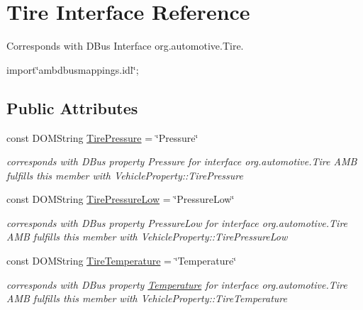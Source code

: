 \hypertarget{interfaceTire}{\section{Tire Interface Reference}
\label{interfaceTire}
}


Corresponds with D\+Bus Interface org.\+automotive.\+Tire.  




{\ttfamily import\char`\"{}ambdbusmappings.\+idl\char`\"{};}

\subsection*{Public Attributes}
\begin{DoxyCompactItemize}
\item 
\hypertarget{interfaceTire_ae9f48caaabe548696d27bc956b135e29}{const D\+O\+M\+String \hyperlink{interfaceTire_ae9f48caaabe548696d27bc956b135e29}{Tire\+Pressure} = \char`\"{}Pressure\char`\"{}}\label{interfaceTire_ae9f48caaabe548696d27bc956b135e29}

\begin{DoxyCompactList}\small\item\em corresponds with D\+Bus property Pressure for interface org.\+automotive.\+Tire A\+M\+B fulfills this member with Vehicle\+Property\+::\+Tire\+Pressure \end{DoxyCompactList}\item 
\hypertarget{interfaceTire_ac3e05d38925b7377fc2a15544cabed91}{const D\+O\+M\+String \hyperlink{interfaceTire_ac3e05d38925b7377fc2a15544cabed91}{Tire\+Pressure\+Low} = \char`\"{}Pressure\+Low\char`\"{}}\label{interfaceTire_ac3e05d38925b7377fc2a15544cabed91}

\begin{DoxyCompactList}\small\item\em corresponds with D\+Bus property Pressure\+Low for interface org.\+automotive.\+Tire A\+M\+B fulfills this member with Vehicle\+Property\+::\+Tire\+Pressure\+Low \end{DoxyCompactList}\item 
\hypertarget{interfaceTire_ab20d18865a45ca32561df4783b15e787}{const D\+O\+M\+String \hyperlink{interfaceTire_ab20d18865a45ca32561df4783b15e787}{Tire\+Temperature} = \char`\"{}Temperature\char`\"{}}\label{interfaceTire_ab20d18865a45ca32561df4783b15e787}

\begin{DoxyCompactList}\small\item\em corresponds with D\+Bus property \hyperlink{interfaceTemperature}{Temperature} for interface org.\+automotive.\+Tire A\+M\+B fulfills this member with Vehicle\+Property\+::\+Tire\+Temperature \end{DoxyCompactList}\end{DoxyCompactItemize}


